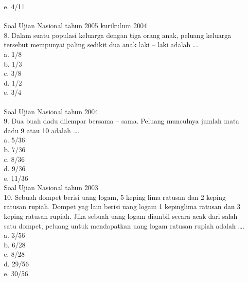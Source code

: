 \documentclass[11pt,fleqn]{book} %
\begin{document}
e. 4/11\\
\\

Soal Ujian Nasional tahun 2005 kurikulum 2004\\
8. Dalam suatu populasi keluarga dengan tiga orang anak, peluang keluarga tersebut mempunyai paling sedikit dua anak laki – laki adalah ….\\

a. 1/8\\

b. 1/3\\

c. 3/8\\

d. 1/2\\

e. 3/4\\
\\

Soal Ujian Nasional tahun 2004\\
9. Dua buah dadu dilempar bersama – sama. Peluang munculnya jumlah mata dadu 9 atau 10 adalah ….\\

a. 5/36\\

b. 7/36\\

c. 8/36\\

d. 9/36\\

e. 11/36\\

Soal Ujian Nasional tahun 2003\\
10. Sebuah dompet berisi uang logam, 5 keping lima ratusan dan 2 keping ratusan rupiah. Dompet yag lain berisi uang logam 1 kepinglima ratusan dan 3 keping ratusan rupiah. Jika sebuah uang logam diambil secara acak dari salah satu dompet, peluang untuk mendapatkan uang logam ratusan rupiah adalah ….\\

a. 3/56\\

b. 6/28\\

c. 8/28\\

d. 29/56\\

e. 30/56\\
\\
\end{document}
